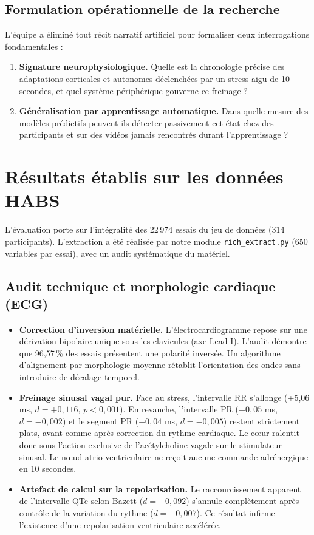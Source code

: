 \documentclass[10pt,a4paper]{article}
\begin{document}
\subsection{Formulation opérationnelle de la recherche}
L'équipe a éliminé tout récit narratif artificiel pour formaliser deux interrogations fondamentales :
\begin{enumerate}
  \item \textbf{Signature neurophysiologique.} Quelle est la chronologie précise des adaptations corticales et autonomes déclenchées par un stress aigu de 10 secondes, et quel système périphérique gouverne ce freinage ?
  \item \textbf{Généralisation par apprentissage automatique.} Dans quelle mesure des modèles prédictifs peuvent-ils détecter passivement cet état chez des participants et sur des vidéos jamais rencontrés durant l'apprentissage ?
\end{enumerate}

\section{Résultats établis sur les données HABS}

L'évaluation porte sur l'intégralité des 22\,974 essais du jeu de données (314 participants). L'extraction a été réalisée par notre module \texttt{rich\_extract.py} (650 variables par essai), avec un audit systématique du matériel.

\subsection{Audit technique et morphologie cardiaque (ECG)}
\begin{itemize}
  \item \textbf{Correction d'inversion matérielle.} L'électrocardiogramme repose sur une dérivation bipolaire unique sous les clavicules (axe Lead I). L'audit démontre que 96,57\,\% des essais présentent une polarité inversée. Un algorithme d'alignement par morphologie moyenne rétablit l'orientation des ondes sans introduire de décalage temporel.
  \item \textbf{Freinage sinusal vagal pur.} Face au stress, l'intervalle RR s'allonge (+5,06 ms, $d = +0,116$, $p < 0,001$). En revanche, l'intervalle PR ($-0,05$ ms, $d = -0,002$) et le segment PR ($-0,04$ ms, $d = -0,005$) restent strictement plats, avant comme après correction du rythme cardiaque. Le cœur ralentit donc sous l'action exclusive de l'acétylcholine vagale sur le stimulateur sinusal. Le nœud atrio-ventriculaire ne reçoit aucune commande adrénergique en 10 secondes.
  \item \textbf{Artefact de calcul sur la repolarisation.} Le raccourcissement apparent de l'intervalle QTc selon Bazett ($d = -0,092$) s'annule complètement après contrôle de la variation du rythme ($d = -0,007$). Ce résultat infirme l'existence d'une repolarisation ventriculaire accélérée.
\end{itemize}
\end{document}
